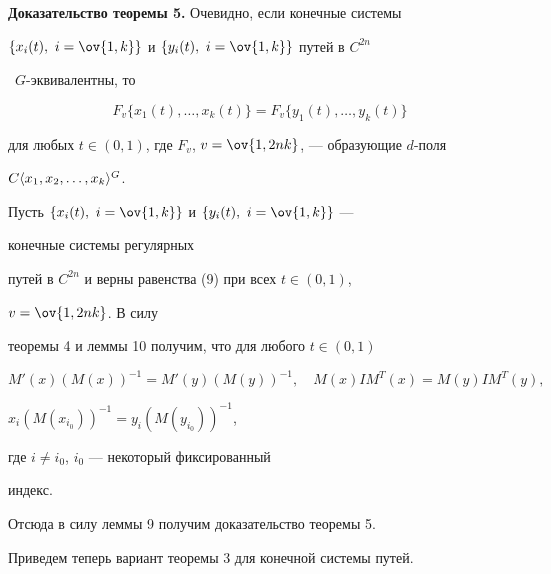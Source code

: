\medskip





{\bf Доказательство теоремы 5.} Очевидно, если конечные системы 


$\{x_i(t), \ i=\ov{1,k}\}$ и $\{y_i(t), \ i=\ov{1,k}\}$ путей в $C^{2n}$ 


\ $G$-эквивалентны, то 


\begin{equation}


F_v\{x_1(t),\dotsc,x_k(t)\}=F_v\{y_1(t),\dotsc,y_k(t)\}


\end{equation}


для любых $t\in(0,1)$, где $F_v$, $v=\ov{1,2nk}$, --- образующие $d$-поля 


$C\langle x_1,x_2,\dotsc,x_k\rangle^G$.





Пусть $\{x_i(t), \ i=\ov{1,k}\}$ и $\{y_i(t), \ i=\ov{1,k}\}$ ---


конечные системы регулярных


путей в $C^{2n}$ и верны равенства (9) при всех $t\in(0,1)$, 


$v=\ov{1,2nk}$. В силу 


теоремы 4 и леммы 10 получим, что для любого $t\in(0,1)$


$$


M'(x)(M(x))^{-1}=M'(y)(M(y))^{-1},\quad


M(x)I M^T(x)=M(y)I M^T(y),


$$


$x_i(M(x_{i_0}))^{-1}=y_i(M(y_{i_0}))^{-1}$, 


где $i\ne i_0$, $i_0$ --- некоторый фиксированный


индекс. 





Отсюда в силу леммы 9 получим доказательство теоремы 5.





Приведем теперь вариант теоремы 3 для конечной системы путей. 





